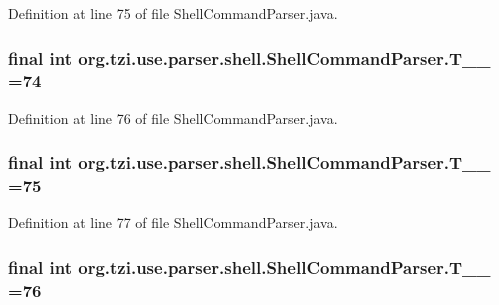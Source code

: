 Definition at line 75 of file Shell\-Command\-Parser.\-java.

\hypertarget{classorg_1_1tzi_1_1use_1_1parser_1_1shell_1_1_shell_command_parser_a48c7e13fca183e0955b8e31784545afc}{
\subsubsection[{T\-\_\-\-\_\-74}]{\setlength{\rightskip}{0pt plus 5cm}final int org.\-tzi.\-use.\-parser.\-shell.\-Shell\-Command\-Parser.\-T\-\_\-\-\_ =74\hspace{0.3cm}{\ttfamily [static]}}}\label{classorg_1_1tzi_1_1use_1_1parser_1_1shell_1_1_shell_command_parser_a48c7e13fca183e0955b8e31784545afc}


Definition at line 76 of file Shell\-Command\-Parser.\-java.

\hypertarget{classorg_1_1tzi_1_1use_1_1parser_1_1shell_1_1_shell_command_parser_afdc4d45f94bf856e2a4f17f1348d41af}{
\subsubsection[{T\-\_\-\-\_\-75}]{\setlength{\rightskip}{0pt plus 5cm}final int org.\-tzi.\-use.\-parser.\-shell.\-Shell\-Command\-Parser.\-T\-\_\-\-\_ =75\hspace{0.3cm}{\ttfamily [static]}}}\label{classorg_1_1tzi_1_1use_1_1parser_1_1shell_1_1_shell_command_parser_afdc4d45f94bf856e2a4f17f1348d41af}


Definition at line 77 of file Shell\-Command\-Parser.\-java.

\hypertarget{classorg_1_1tzi_1_1use_1_1parser_1_1shell_1_1_shell_command_parser_a42fce7e428d5b5a094e432bc46ed61e2}{
\subsubsection[{T\-\_\-\-\_\-76}]{\setlength{\rightskip}{0pt plus 5cm}final int org.\-tzi.\-use.\-parser.\-shell.\-Shell\-Command\-Parser.\-T\-\_\-\-\_ =76\hspace{0.3cm}{\ttfamily [static]}}}\label{classorg_1_1tzi_1_1use_1_1parser_1_1shell_1_1_shell_command_parser_a42fce7e428d5b5a094e432bc46ed61e2}


